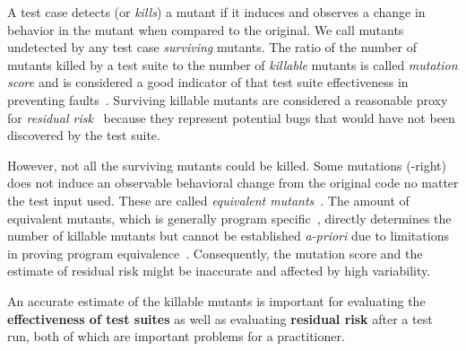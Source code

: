 \documentclass[sigconf,review,anonymous]{acmart}
\begin{document}
A test case detects (or \emph{kills}) a mutant if it induces and observes
a change in behavior in the mutant when compared to the original.
We call mutants undetected by any test case \emph{surviving} mutants.
%
The ratio of the number of mutants killed by a test suite to the 
number of \emph{killable} mutants %
is called \emph{mutation score} and  is considered a good indicator of that test suite
effectiveness in preventing faults~\cite{jia2010an}.
%
Surviving killable mutants are considered a reasonable proxy for \emph{residual risk}~\cite{horgan1996software} because
they represent potential bugs that would have not been discovered by the test suite.

However, not all the surviving mutants could be killed. Some mutations
(-right)
does not induce an observable behavioral change from the original code
no matter the test input used. These
are called \emph{equivalent mutants}~\cite{budd1982two}.
%
The amount of %
equivalent mutants, which is generally
program specific~\cite{offutt1994using,grun2009impact}, directly determines
the number of killable mutants
but cannot be established 
\emph{a-priori} due to limitations in proving program equivalence~\cite{budd1982two,rice1953classes}.
%
Consequently, the mutation score and the estimate of residual risk might be inaccurate
and affected by high variability. %
\begin{tcolorbox}[boxrule=0.5pt, arc=4pt, boxsep=0pt, width=\columnwidth]
An accurate estimate of the killable mutants is important for evaluating the \textbf{effectiveness
of test suites} as well as evaluating \textbf{residual risk} after a test run, both of which are important problems for a practitioner.
\end{tcolorbox}
\end{document}
